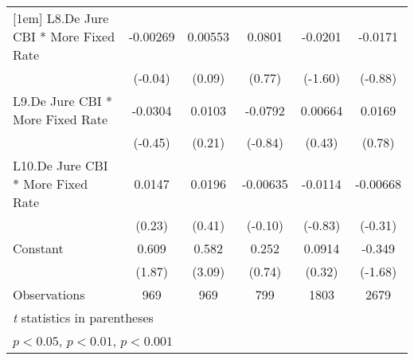 {\begin{tabular}{l*{5}{c}}
[1em]
L8.De Jure CBI * More Fixed Rate& -0.00269         &  0.00553         &   0.0801         &  -0.0201         &  -0.0171         \\
                &  (-0.04)         &   (0.09)         &   (0.77)         &  (-1.60)         &  (-0.88)         \\
[1em]
L9.De Jure CBI * More Fixed Rate&  -0.0304         &   0.0103         &  -0.0792         &  0.00664         &   0.0169         \\
                &  (-0.45)         &   (0.21)         &  (-0.84)         &   (0.43)         &   (0.78)         \\
[1em]
L10.De Jure CBI * More Fixed Rate&   0.0147         &   0.0196         & -0.00635         &  -0.0114         & -0.00668         \\
                &   (0.23)         &   (0.41)         &  (-0.10)         &  (-0.83)         &  (-0.31)         \\
[1em]
Constant        &    0.609         &    0.582\sym{**} &    0.252         &   0.0914         &   -0.349         \\
                &   (1.87)         &   (3.09)         &   (0.74)         &   (0.32)         &  (-1.68)         \\
\hline
Observations    &      969         &      969         &      799         &     1803         &     2679         \\
\hline\hline
\multicolumn{6}{l}{\footnotesize \textit{t} statistics in parentheses}\\
\multicolumn{6}{l}{\footnotesize \sym{*} \(p<0.05\), \sym{**} \(p<0.01\), \sym{***} \(p<0.001\)}\\
\end{tabular}
}
